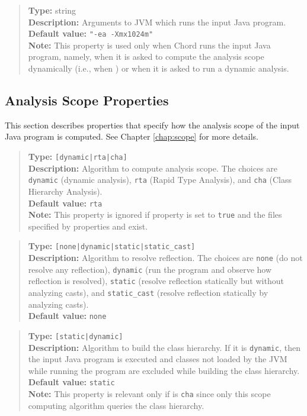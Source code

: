 \begin{quote}
{\bf Type:} string \\
{\bf Description:} Arguments to JVM which runs the input Java program. \\
{\bf Default value:} {\tt "-ea -Xmx1024m"} \\
{\bf Note:} This property is used only when Chord runs the input Java program, namely, when it is asked to compute the analysis scope dynamically (i.e., when ) or when it is asked to run a dynamic analysis. 
\end{quote}

\subsection{Analysis Scope Properties}
\label{sec:scope-props}

This section describes properties that specify how the analysis scope of the input Java program is computed.
See Chapter \ref{chap:scope} for more details.

\begin{quote}
{\bf Type:} {\tt [dynamic|rta|cha]} \\
{\bf Description:} Algorithm to compute analysis scope.  The choices are {\tt dynamic} (dynamic analysis), {\tt rta} (Rapid Type Analysis), and {\tt cha} (Class Hierarchy Analysis). \\
{\bf Default value:} {\tt rta} \\
{\bf Note:} This property is ignored if property  is set to {\tt true} and the files specified by properties  and  exist. 
\end{quote}

\begin{quote}
{\bf Type:} {\tt [none|dynamic|static|static\_cast]} \\
{\bf Description:} Algorithm to resolve reflection.  The choices are {\tt none} (do not resolve any reflection),
{\tt dynamic} (run the program and observe how reflection is resolved),
{\tt static} (resolve reflection statically but without analyzing casts), and
{\tt static\_cast} (resolve reflection statically by analyzing casts). \\
{\bf Default value:} {\tt none}
\end{quote}

\begin{quote}
{\bf Type:} {\tt [static|dynamic]} \\
{\bf Description:} Algorithm to build the class hierarchy.  If it is {\tt dynamic}, then the input Java program is executed
and classes not loaded by the JVM while running the program are excluded while building the class hierarchy. \\
{\bf Default value:} {\tt static} \\
{\bf Note:} This property is relevant only if  is {\tt cha} since only this
scope computing algorithm queries the class hierarchy. 
\end{quote}

